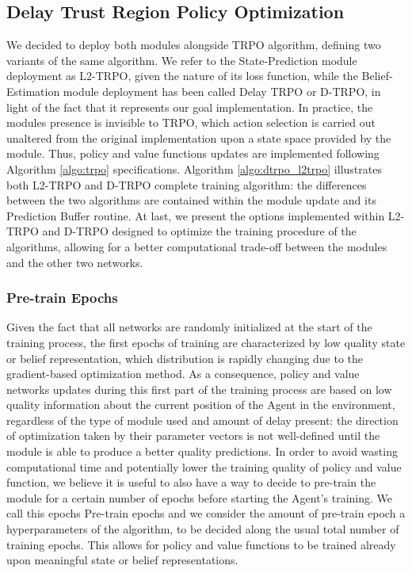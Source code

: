         \subsection{Delay Trust Region Policy Optimization}
        \label{sub:dtrpo}
            
            We decided to deploy both modules alongside TRPO algorithm, defining two variants of the same algorithm. We refer to the State-Prediction module deployment as L2-TRPO, given the nature of its loss function, while the Belief-Estimation module deployment has been called Delay TRPO or D-TRPO, in light of the fact that it represents our goal implementation. In practice, the modules presence is invisible to TRPO, which action selection is carried out unaltered from the original implementation upon a state space provided by the module. Thus, policy and value functions updates are implemented following Algorithm \ref{algo:trpo} specifications. Algorithm \ref{algo:dtrpo_l2trpo} illustrates both L2-TRPO and D-TRPO complete training algorithm: the differences between the two algorithms are contained within the module update and its Prediction Buffer routine. \newline
            At last, we present the options implemented within L2-TRPO and D-TRPO designed to optimize the training procedure of the algorithms, allowing for a better computational trade-off between the modules and the other two networks.
            
            \subsubsection{Pre-train Epochs}
                Given the fact that all networks are randomly initialized at the start of the training process, the first epochs of training are characterized by low quality state or belief representation, which distribution is rapidly changing due to the gradient-based optimization method. As a consequence, policy and value networks updates during this first part of the training process are based on low quality information about the current position of the Agent in the environment, regardless of the type of module used and amount of delay present: the direction of optimization taken by their parameter vectors is not well-defined until the module is able to produce a better quality predictions. \newline
                In order to avoid wasting computational time and potentially lower the training quality of policy and value function, we believe it is useful to also have a way to decide to pre-train the module for a certain number of epochs before starting the Agent's training. We call this epochs Pre-train epochs and we consider the amount of pre-train epoch a hyperparameters of the algorithm, to be decided along the usual total number of training epochs. This allows for policy and value functions to be trained already upon meaningful state or belief representations.
                
